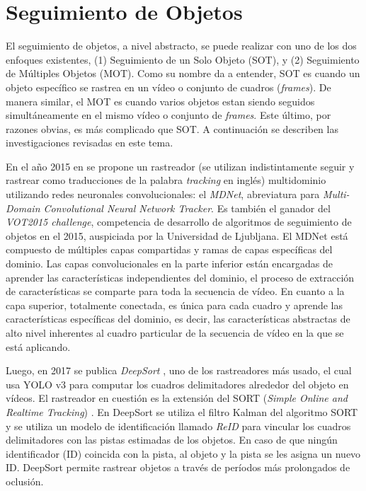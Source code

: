 \section{Seguimiento de Objetos}

El seguimiento de objetos, a nivel abstracto, se puede realizar con uno de los dos enfoques existentes, (1) Seguimiento de un Solo Objeto (SOT), y (2) Seguimiento de Múltiples Objetos (MOT). Como su nombre da a entender, SOT es cuando un objeto específico se rastrea en un vídeo o conjunto de cuadros (\textit{frames}). De manera similar, el MOT es cuando varios objetos estan siendo seguidos simultáneamente en el mismo vídeo o conjunto de \textit{frames}. Este último, por razones obvias, es más complicado que SOT. A continuación se describen las investigaciones revisadas en este tema.

En el año 2015 en \cite{nam2016learning} se propone un rastreador (se utilizan indistintamente seguir y rastrear como traducciones de la palabra \textit{tracking} en inglés) multidominio utilizando redes neuronales convolucionales: el \textit{MDNet}, abreviatura para \textit{Multi-Domain Convolutional Neural Network Tracker}. Es también el ganador del \textit{VOT2015 challenge}, competencia de desarrollo de algoritmos de seguimiento de objetos en el 2015, auspiciada por la Universidad de Ljubljana. El MDNet está compuesto de múltiples capas compartidas y ramas de capas específicas del dominio. Las capas convolucionales en la parte inferior están encargadas de aprender las características independientes del dominio, el proceso de extracción de características se comparte para toda la secuencia de vídeo. En cuanto a la capa superior, totalmente conectada, es única para cada cuadro y aprende las características específicas del dominio, es decir, las características abstractas de alto nivel inherentes al cuadro particular de la secuencia de vídeo en la que se está aplicando.

Luego, en 2017 se publica \textit{DeepSort} \cite{wojke2017simple}, uno de los rastreadores más usado, el cual usa YOLO v3 \cite{redmon2018yolov3} para computar los cuadros delimitadores alrededor del objeto en vídeos. El rastreador en cuestión es la extensión del  SORT (\textit{Simple Online and Realtime Tracking}) \cite{bewley2016simple}. En DeepSort se utiliza el filtro Kalman \cite{welch1995introduction} del algoritmo SORT y se utiliza un modelo de identificación llamado \textit{ReID} para vincular los cuadros delimitadores con las pistas estimadas de los objetos. En caso de que ningún identificador (ID) coincida con la pista, al objeto y la pista se les asigna un nuevo ID. DeepSort permite rastrear objetos a través de períodos más prolongados de oclusión.

